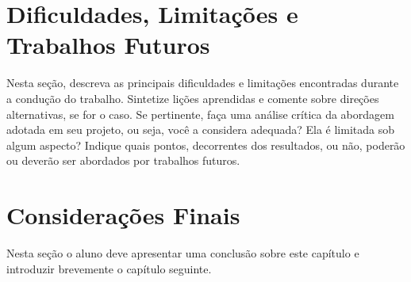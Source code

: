 \section{Dificuldades, Limitações e Trabalhos Futuros}
Nesta  seção,   descreva  as  principais  dificuldades   e  limitações
encontradas  durante   a  condução   do  trabalho.   Sintetize  lições
aprendidas e  comente sobre direções  alternativas, se for o  caso. Se
pertinente,  faça uma  análise  crítica da  abordagem  adotada em  seu
projeto, ou seja, você a considera  adequada? Ela é limitada sob algum
aspecto?  Indique quais  pontos, decorrentes  dos resultados,  ou não,
poderão ou deverão ser abordados por trabalhos futuros.

\section{Considerações Finais}
Nesta seção o aluno deve  apresentar uma conclusão sobre este capítulo
e introduzir brevemente o capítulo seguinte.
